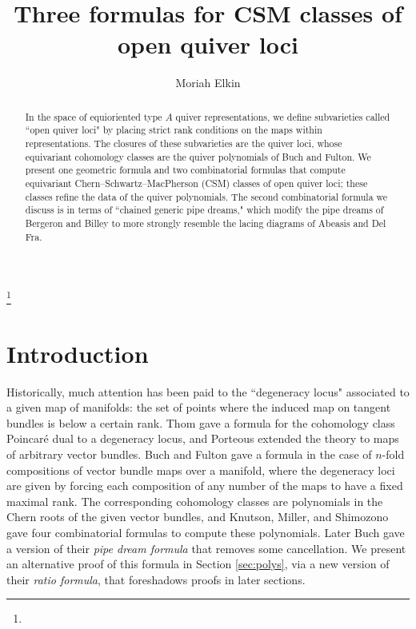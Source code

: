 \documentclass[reqno]{amsart}
\numberwithin{equation}{section}
\theoremstyle{definition}
\theoremstyle{remark}
\begin{document}
\title[CSM classes of open quiver loci]{Three formulas
 for CSM classes of open quiver loci}


\author[M. Elkin]{Moriah Elkin}
\address{Cornell University, Ithaca, NY}


\keywords{}
\thanks{}  

\begin{abstract}
In the space of equioriented type $A$ quiver representations, we define subvarieties called ``open quiver loci" by placing strict rank conditions on the maps within representations. The closures of these subvarieties are the quiver loci, whose equivariant cohomology classes are the quiver polynomials of Buch and Fulton. We present one geometric formula and two combinatorial formulas that compute equivariant Chern--Schwartz--MacPherson (CSM) classes of open quiver loci; these classes refine the data of the quiver polynomials. The second combinatorial formula we discuss is in terms of ``chained generic pipe dreams," which modify the pipe dreams of Bergeron and Billey to more strongly resemble the lacing diagrams of Abeasis and Del Fra.
\end{abstract}


\maketitle

\tableofcontents


\section{Introduction}\label{sec:intro}
Historically, much attention has been paid to the ``degeneracy locus" associated to a given map of manifolds: the set of points where the induced map on tangent bundles is below a certain rank. Thom \cite{Thom55} gave a formula for the cohomology class Poincar{\'e} dual to a degeneracy locus, and Porteous \cite{Port} extended the theory to maps of arbitrary vector bundles. Buch and Fulton \cite{BF99} gave a formula in the case of $n$-fold compositions of vector bundle maps over a manifold, where the degeneracy loci are given by forcing each composition of any number of the maps to have a fixed maximal rank. The corresponding cohomology classes are polynomials in the Chern roots of the given vector bundles, and Knutson, Miller, and Shimozono \cite{kms06} gave four combinatorial formulas to compute these polynomials. Later Buch \cite{B04} gave a version of their \emph{pipe dream formula} that removes some cancellation. We present an alternative proof of this formula in Section \ref{sec:polys}, via a new version of their \emph{ratio formula}, that foreshadows proofs in later sections.
\end{document}
